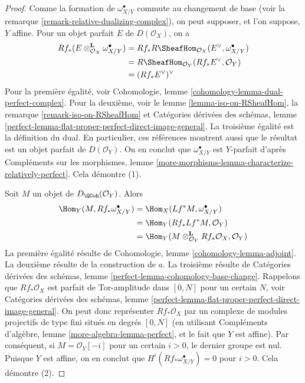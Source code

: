 \begin{proof}
Comme la formation de $\omega_{X/Y}^\bullet$ commute au changement de base (voir la remarque \ref{remark-relative-dualizing-complex}), on peut supposer, et l'on suppose, $Y$ affine. Pour un objet parfait $E$ de $D(\mathcal{O}_X)$, on a
\begin{align*}
Rf_*(E \otimes_{\mathcal{O}_X}^\mathbf{L} \omega_{X/Y}^\bullet)
& =
Rf_*R\SheafHom_{\mathcal{O}_X}(E^\vee, \omega_{X/Y}^\bullet) \\
& =
R\SheafHom_{\mathcal{O}_Y}(Rf_*E^\vee, \mathcal{O}_Y) \\
& =
(Rf_*E^\vee)^\vee
\end{align*}
Pour la première égalité, voir Cohomologie, lemme \ref{cohomology-lemma-dual-perfect-complex}. Pour la deuxième, voir le lemme \ref{lemma-iso-on-RSheafHom}, la remarque \ref{remark-iso-on-RSheafHom} et Catégories dérivées des schémas, lemme \ref{perfect-lemma-flat-proper-perfect-direct-image-general}. La troisième égalité est la définition du dual. En particulier, ces références montrent aussi que le résultat est un objet parfait de $D(\mathcal{O}_Y)$. On en conclut que $\omega_{X/Y}^\bullet$ est $Y$-parfait d'après Compléments sur les morphismes, lemme \ref{more-morphisms-lemma-characterize-relatively-perfect}. Cela démontre (1).

\medskip\noindent
Soit $M$ un objet de $D_\QCoh(\mathcal{O}_Y)$. Alors
\begin{align*}
\Hom_Y(M, Rf_*\omega_{X/Y}^\bullet) & =
\Hom_X(Lf^*M, \omega_{X/Y}^\bullet) \\
& =
\Hom_Y(Rf_*Lf^*M, \mathcal{O}_Y) \\
& =
\Hom_Y(M \otimes_{\mathcal{O}_Y}^\mathbf{L} Rf_*\mathcal{O}_X, \mathcal{O}_Y)
\end{align*}
La première égalité résulte de Cohomologie, lemme \ref{cohomology-lemma-adjoint}. La deuxième résulte de la construction de $a$. La troisième résulte de Catégories dérivées des schémas, lemme \ref{perfect-lemma-cohomology-base-change}. Rappelons que $Rf_*\mathcal{O}_X$ est parfait de Tor-amplitude dans $[0, N]$ pour un certain $N$, voir Catégories dérivées des schémas, lemme \ref{perfect-lemma-flat-proper-perfect-direct-image-general}. On peut donc représenter $Rf_*\mathcal{O}_X$ par un complexe de modules projectifs de type fini situés en degrés $[0, N]$ (en utilisant Compléments d'algèbre, lemme \ref{more-algebra-lemma-perfect}, et le fait que $Y$ est affine). Par conséquent, si $M = \mathcal{O}_Y[-i]$ pour un certain $i > 0$, le dernier groupe est nul. Puisque $Y$ est affine, on en conclut que $H^i(Rf_*\omega_{X/Y}^\bullet) = 0$ pour $i > 0$. Cela démontre (2).


\end{proof}
